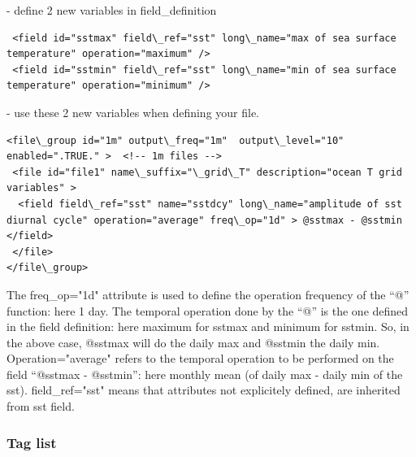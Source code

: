  - define 2 new variables in field\_definition
\vspace{-20pt}
\begin{alltt}  {{\scriptsize    
\begin{verbatim}
 <field id="sstmax" field\_ref="sst" long\_name="max of sea surface temperature" operation="maximum" />
 <field id="sstmin" field\_ref="sst" long\_name="min of sea surface temperature" operation="minimum" />
\end{verbatim}
}}\end{alltt} 
 - use these 2 new variables when defining your file.  
\vspace{-20pt}
\begin{alltt}  {{\scriptsize    
\begin{verbatim}
<file\_group id="1m" output\_freq="1m"  output\_level="10" enabled=".TRUE." >  <!-- 1m files -->  
 <file id="file1" name\_suffix="\_grid\_T" description="ocean T grid variables" >
  <field field\_ref="sst" name="sstdcy" long\_name="amplitude of sst diurnal cycle" operation="average" freq\_op="1d" > @sstmax - @sstmin </field>
 </file>
</file\_group> 
\end{verbatim}
}}\end{alltt}
The freq\_op="1d" attribute is used to define the operation frequency of the ``@'' function: here 1 day. The temporal operation done by the ``@'' is the one defined in the field definition: here maximum for sstmax and minimum for sstmin. So, in the above case, @sstmax will do the daily max and @sstmin the daily min. Operation="average" refers to the temporal operation to be performed on the field ``@sstmax - @sstmin'': here monthly mean (of daily max - daily min of the sst). field\_ref="sst" means that attributes not explicitely defined, are inherited from sst field.



\subsubsection{Tag list}

